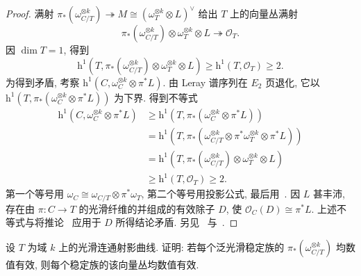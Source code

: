 \begin{proof}
满射 $\pi_*(\omega_{C/T}^{\otimes k})\twoheadrightarrow M\cong(\omega_T^{\otimes k}\otimes L)^\vee$ 给出 $T$ 上的向量丛满射
\[
\pi_*(\omega_{C/T}^{\otimes k})\otimes\omega_T^{\otimes k}\otimes L\twoheadrightarrow\mathcal O_T.
\]
因 $\dim T=1$, 得到
\begin{equation}\label{src:6.9.22}
\mathrm h^1(T,\pi_*(\omega_{C/T}^{\otimes k})\otimes\omega_T^{\otimes k}\otimes L)\geq\mathrm h^1(T,\mathcal O_T)\geq2.
\end{equation}
为得到矛盾, 考察 $\mathrm h^1(C,\allowbreak \omega_C^{\otimes k}\otimes\pi^*L)$. 由 Leray 谱序列在 $E_2$ 页退化, 它以 $\mathrm h^1(T,\allowbreak \pi_*(\omega_C^{\otimes k}\otimes\pi^*L))$ 为下界. 得到不等式
\[
\begin{aligned}
\mathrm h^1(C,\omega_C^{\otimes k}\otimes\pi^*L)
&\geq\mathrm h^1(T,\pi_*(\omega_C^{\otimes k}\otimes\pi^*L))\\
&=\mathrm h^1(T,\pi_*(\omega_{C/T}^{\otimes k}\otimes\pi^*\omega_T^{\otimes k}\otimes\pi^*L))\\
&=\mathrm h^1(T,\pi_*(\omega_{C/T}^{\otimes k})\otimes\omega_T^{\otimes k}\otimes L)\\
&\geq\mathrm h^1(T,\mathcal O_T)\geq2.
\end{aligned}
\]
第一个等号用 $\omega_C\cong\omega_{C/T}\otimes\pi^*\omega_T$, 第二个等号用投影公式, 最后用~. 因 $L$ 甚丰沛, 存在由 $\pi:C\to\allowbreak T$ 的光滑纤维的并组成的有效除子 $D$, 使 $\mathcal O_C(D)\cong\pi^*L$. 上述不等式与将推论~ 应用于 $D$ 所得结论矛盾. 另见~\cite[定理 4.3]{Kol90} 与~\cite[定理 6.10]{CLM22}.
\end{proof}
\begin{exercise}[细节]\label{src:6.9.23}
设 $T$ 为域 $k$ 上的光滑连通射影曲线. 证明: 若每个泛光滑稳定族的 $\pi_*(\omega_{C/T}^{\otimes k})$ 均数值有效, 则每个稳定族的该向量丛均数值有效.
\end{exercise}
